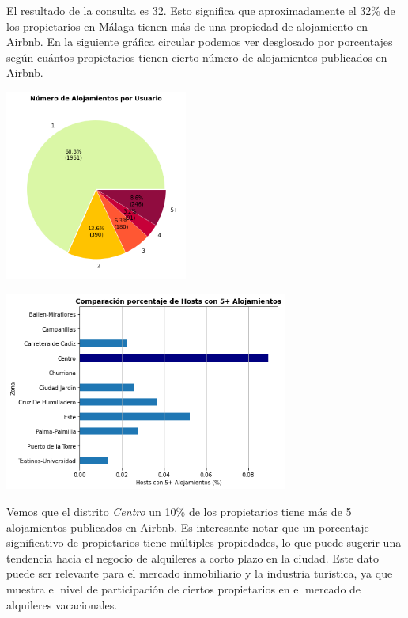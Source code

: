 El resultado de la consulta es 32. Esto significa que aproximadamente el 32\% de los propietarios en Málaga tienen más de una propiedad de alojamiento en Airbnb. En la siguiente gráfica circular podemos ver desglosado por porcentajes según cuántos propietarios tienen cierto número de alojamientos publicados en Airbnb.

\begin{center}
    \centering
    \includegraphics[width=0.45\textwidth]{capturas/12.png}
\end{center}
\begin{center}
    \centering
    \includegraphics[width=0.7\textwidth]{capturas/13.png}
\end{center}
Vemos que el distrito \textit{Centro} un 10\% de los propietarios tiene más de 5 alojamientos publicados en Airbnb. Es interesante notar que un porcentaje significativo de propietarios tiene múltiples propiedades, lo que puede sugerir una tendencia hacia el negocio de alquileres a corto plazo en la ciudad. Este dato puede ser relevante para el mercado inmobiliario y la industria turística, ya que muestra el nivel de participación de ciertos propietarios en el mercado de alquileres vacacionales.

